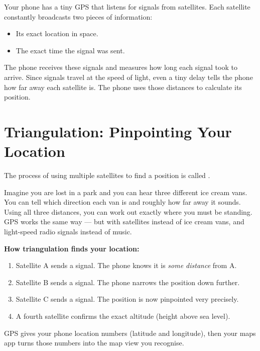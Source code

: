 Your phone has a tiny GPS  that listens for signals from satellites.
Each satellite constantly broadcasts two pieces of information:
\begin{itemize}
  \item Its exact location in space.
  \item The exact time the signal was sent.
\end{itemize}

The phone receives these signals and measures how long each signal took to arrive.
Since signals travel at the speed of light, even a tiny delay tells the phone
how far away each satellite is. The phone uses those distances to calculate its position.

\sectionrule

\section*{Triangulation: Pinpointing Your Location}

The process of using multiple satellites to find a position is called .

\begin{picturethis}
  Imagine you are lost in a park and you can hear three different ice cream vans.
  You can tell which direction each van is and roughly how far away it sounds.
  Using all three distances, you can work out exactly where you must be standing.
  GPS works the same way — but with satellites instead of ice cream vans,
  and light-speed radio signals instead of music.
\end{picturethis}

\begin{quickmap}
  \textbf{How triangulation finds your location:}
  \begin{enumerate}[label=\textbf{\arabic*.}]
    \item Satellite A sends a signal. The phone knows it is \emph{some distance} from A.
    \item Satellite B sends a signal. The phone narrows the position down further.
    \item Satellite C sends a signal. The position is now pinpointed very precisely.
    \item A fourth satellite confirms the exact altitude (height above sea level).
  \end{enumerate}
\end{quickmap}

GPS gives your phone location numbers (latitude and longitude),
then your maps app turns those numbers into the map view you recognise.

